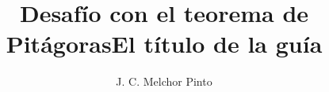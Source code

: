 \documentclass[12pt,addpoints,answers]{guia}
\title{Desafío con el teorema de Pitágoras}
\title{El título de la guía}
\author{J. C. Melchor Pinto}
\begin{document}
\pagestyle{headandfoot}

\INFO
\printanswers

\newpage
\begin{questions}
    \questionboxed[10] 
    \questionboxed[10] 
    \questionboxed[10] 
    \questionboxed[10] 
    \questionboxed[10] 
    \questionboxed[10] 
    \questionboxed[10] 
    \questionboxed[10] 
    \questionboxed[10] 
\end{questions}
\end{document}

